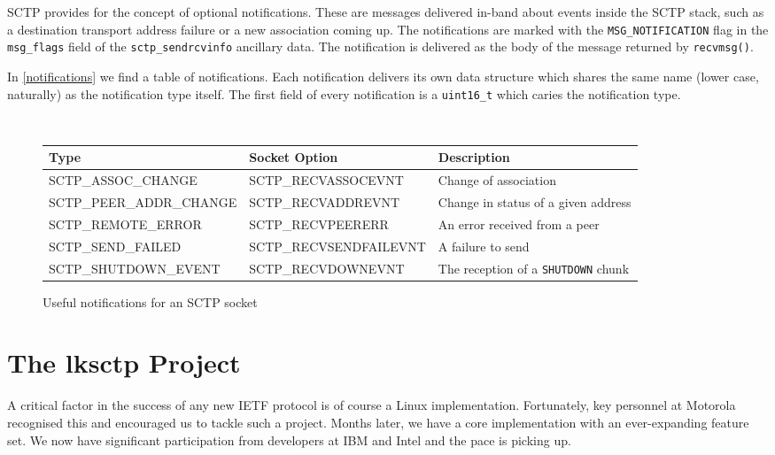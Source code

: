\documentclass[twocolumn]{article}
\begin{document}
SCTP provides for the concept of optional notifications.  These are
messages delivered in-band about events inside the SCTP stack, such as
a destination transport address failure or a new association coming
up.  The notifications are marked with the \texttt{MSG\_NOTIFICATION}
flag in the \texttt{msg\_flags} field of the \texttt{sctp\_sendrcvinfo}
ancillary data.  The notification is delivered as the body of the
message returned by \texttt{recvmsg()}.

In \ref{notifications} we find a table of notifications.  Each
notification delivers its own data structure which shares the same
name (lower case, naturally) as the notification type itself.  The first
field of every notification is a \texttt{uint16\_t} which caries the
notification type.

\begin{figure*}[t]
\begin{center}
{\tt
\begin{tabular}{ l  l  l }
   \hline
   \textnormal{Type} & \textnormal{Socket Option} & \textnormal{Description} \\
   \hline
   SCTP\_ASSOC\_CHANGE 		& SCTP\_RECVASSOCEVNT	&  \textnormal{Change of association} \\
   SCTP\_PEER\_ADDR\_CHANGE	& SCTP\_RECVADDREVNT	& \textnormal{Change in status of a given address} \\
   SCTP\_REMOTE\_ERROR		& SCTP\_RECVPEERERR	& \textnormal{An error received from a peer} \\
   SCTP\_SEND\_FAILED		& SCTP\_RECVSENDFAILEVNT & \textnormal{A failure to send} \\
   SCTP\_SHUTDOWN\_EVENT	& SCTP\_RECVDOWNEVNT	& \textnormal{The reception of a \texttt{SHUTDOWN} chunk} \\
\end{tabular}
}
\end{center}
\caption{\label{notification}Useful notifications for an SCTP socket}
\end{figure*}

\section{The lksctp Project}

A critical factor in the success of any new IETF protocol is of course
a Linux implementation.  Fortunately, key personnel at Motorola
recognised this and encouraged us to tackle such a project.  Months
later, we have a core implementation with an ever-expanding feature
set.  We now have significant participation from developers at IBM and
Intel and the pace is picking up.
\end{document}
